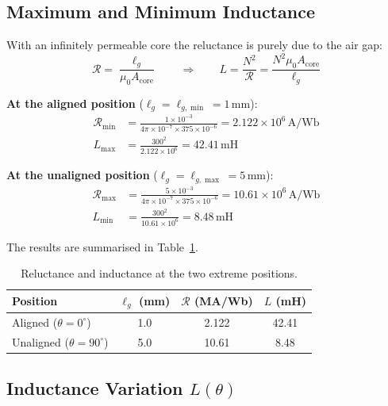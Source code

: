 \documentclass[12pt,a4paper]{article}
\newcommand{\unit}[1]{\,\mathrm{#1}}
\begin{document}
\subsection{Maximum and Minimum Inductance}

With an infinitely permeable core the reluctance is purely due to
the air gap:
\begin{equation}
  \mathcal{R} = \frac{\ell_g}{\mu_0 A_{\mathrm{core}}}
  \qquad \Rightarrow \qquad
  L = \frac{N^2}{\mathcal{R}} = \frac{N^2 \mu_0 A_{\mathrm{core}}}{\ell_g}
\end{equation}

\textbf{At the aligned position} ($\ell_g = \ell_{g,\min} = 1\unit{mm}$):
\begin{align}
  \mathcal{R}_{\min}
    &= \frac{1\times10^{-3}}{4\pi\times10^{-7}\times375\times10^{-6}}
     = 2.122\times10^{6}\unit{A/Wb} \\
  L_{\max}
    &= \frac{300^2}{2.122\times10^{6}} = 42.41\unit{mH}
\end{align}

\textbf{At the unaligned position} ($\ell_g = \ell_{g,\max} = 5\unit{mm}$):
\begin{align}
  \mathcal{R}_{\max}
    &= \frac{5\times10^{-3}}{4\pi\times10^{-7}\times375\times10^{-6}}
     = 10.61\times10^{6}\unit{A/Wb} \\
  L_{\min}
    &= \frac{300^2}{10.61\times10^{6}} = 8.48\unit{mH}
\end{align}

The results are summarised in Table~\ref{tab:LR}.

\begin{table}[H]
  \centering
  \caption{Reluctance and inductance at the two extreme positions.}
  \label{tab:LR}
  \renewcommand{\arraystretch}{1.3}
  \begin{tabular}{|l|c|c|c|}
    \hline
    \textbf{Position} & $\ell_g$ (mm) & $\mathcal{R}$ (MA/Wb) & $L$ (mH) \\
    \hline
    Aligned ($\theta = 0^{\circ}$)    & 1.0 & 2.122 & 42.41 \\
    Unaligned ($\theta = 90^{\circ}$) & 5.0 & 10.61 & 8.48  \\
    \hline
  \end{tabular}
\end{table}

\subsection{Inductance Variation $L(\theta)$}
\end{document}
